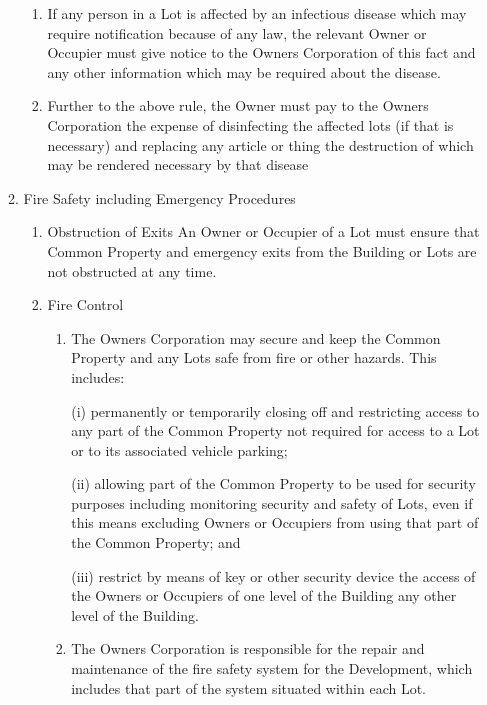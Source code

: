 \documentclass{article}
\begin{document}
\begin{enumerate}[label=\arabic*.]
\begin{enumerate}[label=\arabic{enumi}.\arabic*.]
\begin{enumerate}[label=(\arabic*)]
\item  If any person in a Lot is affected by an infectious disease which may require notification because of any law, the relevant Owner or Occupier must give notice to the Owners Corporation of this fact and any other information which may be required about the disease.

\item  Further to the above rule, the Owner must pay to the Owners Corporation the expense of disinfecting the affected lots (if that is necessary) and replacing any article or thing the destruction of which may be rendered necessary by that disease

\end{enumerate}

\item  Fire Safety including Emergency Procedures

\begin{enumerate}[label=(\arabic*)]

\item  Obstruction of Exits
\newline An Owner or Occupier of a Lot must ensure that Common Property and emergency exits from the Building or Lots are not obstructed at any time.

\item  Fire Control

\begin{enumerate}[label=(\alph*)]

\item  The Owners Corporation may secure and keep the Common Property and any Lots safe from fire or other hazards. This includes:

(i) permanently or temporarily closing off and restricting access to any part of the Common Property not required for access to a Lot or to its associated vehicle parking;

(ii) allowing part of the Common Property to be used for security purposes including monitoring security and safety of Lots, even if this means excluding Owners or Occupiers from using that part of the Common Property; and

(iii) restrict by means of key or other security device the access of the Owners or Occupiers of one level of the Building any other level of the Building.

\item  The Owners Corporation is responsible for the repair and maintenance of the fire safety system for the Development, which includes that part of the system situated within each Lot.


\end{enumerate}
\end{enumerate}
\end{enumerate}
\end{enumerate}
\end{document}
